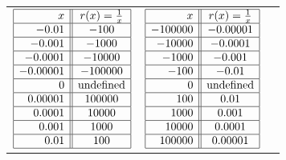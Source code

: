 \documentclass{ximera}
\begin{document}
\begin{center}
\begin{tabular}{m{2in}m{2in}m{2in}}

$\begin{array}{|r||c|}  \hline

  x & r(x) = \frac{1}{x}  \\ \hline
 -0.01& -100  \\  \hline
 -0.001 & -1000  \\  \hline 
 -0.0001 & -10000  \\  \hline 
 -0.00001 & -100000 \\  \hline 
0 & \text{undefined} \\  \hline
0.00001 & 100000 \\  \hline  
0.0001 & 10000  \\  \hline 
 0.001 & 1000  \\  \hline 
 0.01 & 100  \\  \hline
  \end{array} $
  
  &
  
  $\begin{array}{|r||c|}  \hline

  x & r(x) = \frac{1}{x}  \\ \hline
 -100000 & -0.00001  \\  \hline 
 -10000 &  -0.0001 \\  \hline 
 -1000 & -0.001  \\  \hline 
 -100 & -0.01  \\  \hline
0 & \text{undefined} \\  \hline
 100 & 0.01  \\  \hline
 1000 & 0.001  \\  \hline 
 10000 & 0.0001 \\  \hline
 100000 & 0.00001  \\  \hline  
  \end{array} $
  
  &
  



\end{tabular}
\end{center}
\end{document}
